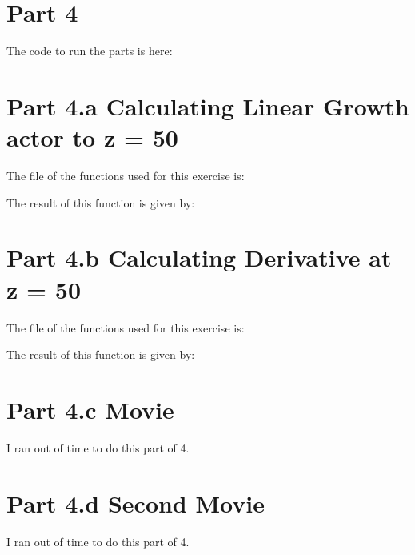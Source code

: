 \section{Part 4}

The code to run the parts is here:



\section{Part 4.a Calculating Linear Growth actor to z = 50}

The file of the functions used for this exercise is:



The result of this function is given by:




\section{Part 4.b Calculating Derivative at z = 50}

The file of the functions used for this exercise is:



The result of this function is given by:



\section{Part 4.c Movie}

I ran out of time to do this part of 4.

\section{Part 4.d Second Movie}

I ran out of time to do this part of 4.
